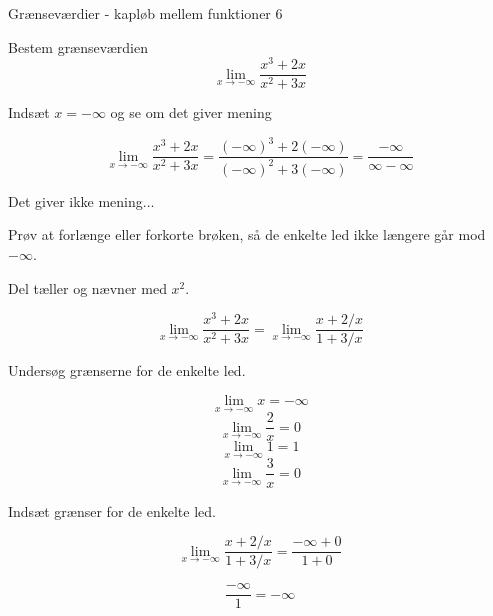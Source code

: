 \documentclass{article}
\begin{document}
\begin{exercise}{Grænseværdier - kapløb mellem funktioner 6}
	
	Bestem grænseværdien 
	\[
	\lim_{x \to -\infty} \frac{x^3 + 2x}{x^2 + 3x}
	\]
	
	
	\hint
	Indsæt $x=-\infty$ og se om det giver mening
	
	\hint
	\[
	\lim_{x \to -\infty} \frac{x^3 + 2x}{x^2 + 3x} = \frac{(-\infty)^3 + 2(-\infty)}{(-\infty)^2 + 3(-\infty)} = \frac{-\infty}{\infty-\infty}
	\]
	
	\hint
	Det giver ikke mening...
	
	\hint
	Prøv at forlænge eller forkorte brøken, så de enkelte led ikke længere går mod $-\infty$. 
	
	\hint
	Del tæller og nævner med $x^2$. 
	
	\hint
	\[
	\lim_{x \to -\infty} \frac{x^3 + 2x}{x^2 + 3x} = \lim_{x \to -\infty} \frac{x + 2/x}{1 + 3/x}
	\]
	
	\hint
	Undersøg grænserne for de enkelte led.
	
	\hint
	\[
	\lim_{x \to -\infty} x = -\infty
	\]
	\[
	\lim_{x \to -\infty} \frac{2}{x} = 0
	\]
	\[
	\lim_{x \to -\infty} 1= 1
	\]
	\[
	\lim_{x \to -\infty} \frac{3}{x} = 0
	\]
	
	\hint 
	Indsæt grænser for de enkelte led.
	
	\hint
	\[
	\lim_{x \to -\infty} \frac{x + 2/x}{1 + 3/x} = \frac{-\infty + 0}{1 + 0 } 
	\]
	
	\hint
	\[
	\frac{-\infty}{1  }  = -\infty
	\]
	
\end{exercise}
\newpage
\end{document}
